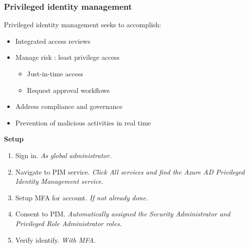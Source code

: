 \subsubsection{Privileged identity management}
Privileged identity management seeks to accomplish:
\begin{itemize}
\item Integrated access reviews 
\item Manage risk : least privilege access
	\begin{itemize}	
	\item Just-in-time access
	\item Request approval workflows
	\end{itemize}
\item Address compliance and governance
\item Prevention of malicious activities in real time
\end{itemize}

\textbf{Setup}
\begin{enumerate}
\item Sign in. \textit{As global administrator.}
\item Navigate to PIM service. \textit{Click All services and find the Azure AD Privileged Identity Management service.}
\item Setup MFA for account. \textit{If not already done.}
\item Consent to PIM. \textit{Automatically assigned the Security Administrator and Privileged Role Administrator roles.}
\item Verify identify. \textit{With MFA.}
\end{enumerate}


